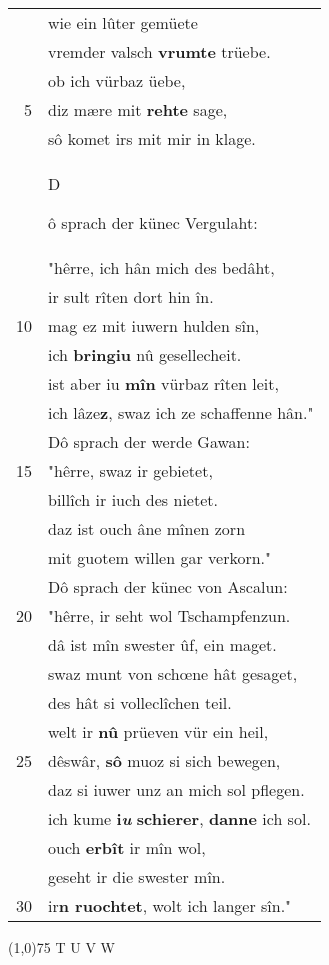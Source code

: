 \documentclass[8pt,a4paper,notitlepage]{article}
\begin{document}
\begin{table}[ht]
\begin{minipage}[t]{0.5\linewidth}
\begin{tabular}{rl}
 & wie ein lûter gemüete\\ 
 & vremder valsch \textbf{vrumte} trüebe.\\ 
 & ob ich vürbaz üebe,\\ 
5 & diz mære mit \textbf{rehte} sage,\\ 
 & sô komet irs mit mir in klage.\\ 
 & \begin{large}D\end{large}ô sprach der künec Vergulaht:\\ 
 & "hêrre, ich hân mich des bedâht,\\ 
 & ir sult rîten dort hin în.\\ 
10 & mag ez mit iuwern hulden sîn,\\ 
 & ich \textbf{bringiu} nû gesellecheit.\\ 
 & ist aber iu \textbf{mîn} vürbaz rîten leit,\\ 
 & ich lâze\textbf{z}, swaz ich ze schaffenne hân."\\ 
 & Dô sprach der werde Gawan:\\ 
15 & "hêrre, swaz ir gebietet,\\ 
 & billîch ir iuch des nietet.\\ 
 & daz ist ouch âne mînen zorn\\ 
 & mit guotem willen gar verkorn."\\ 
 & Dô sprach der künec von Ascalun:\\ 
20 & "hêrre, ir seht wol Tschampfenzun.\\ 
 & dâ ist mîn swester ûf, ein maget.\\ 
 & swaz munt von schœne hât gesaget,\\ 
 & des hât si volleclîchen teil.\\ 
 & welt ir \textbf{nû} prüeven vür ein heil,\\ 
25 & dêswâr, \textbf{sô} muoz si sich bewegen,\\ 
 & daz si iuwer unz an mich sol pflegen.\\ 
 & ich kume \textbf{i\textit{u}} \textbf{schierer}, \textbf{danne} ich sol.\\ 
 & ouch \textbf{erbît} ir mîn wol,\\ 
 & geseht ir die swester mîn.\\ 
30 & ir\textbf{n ruochtet}, wolt ich langer sîn."\\ 
\end{tabular}
\scriptsize
\line(1,0){75} \newline
T U V W \newline

\end{minipage}
\end{table}
\end{document}
